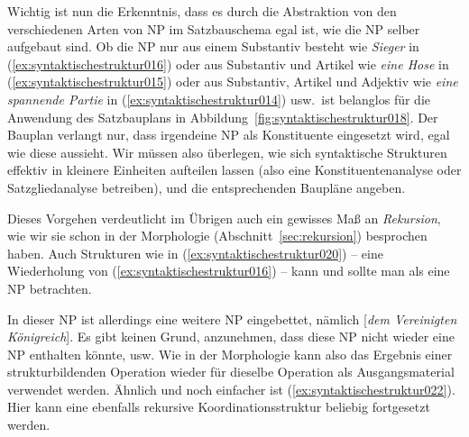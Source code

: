 Wichtig ist nun die Erkenntnis, dass es durch die Abstraktion von den verschiedenen Arten von NP im Satzbauschema egal ist, wie die NP selber aufgebaut sind.
Ob die NP nur aus einem Substantiv besteht wie \textit{Sieger} in (\ref{ex:syntaktischestruktur016}) oder aus Substantiv und Artikel wie \textit{eine Hose} in (\ref{ex:syntaktischestruktur015}) oder aus Substantiv, Artikel und Adjektiv wie \textit{eine spannende Partie} in (\ref{ex:syntaktischestruktur014}) usw.\ ist belanglos für die Anwendung des Satzbauplans in Abbildung~\ref{fig:syntaktischestruktur018}.
Der Bauplan verlangt nur, dass irgendeine NP als Konstituente eingesetzt wird, egal wie diese aussieht.
Wir müssen also überlegen, wie sich syntaktische Strukturen effektiv in kleinere Einheiten aufteilen lassen (also eine Konstituentenanalyse oder Satzgliedanalyse betreiben), und die entsprechenden Baupläne angeben.


Dieses Vorgehen verdeutlicht im Übrigen auch ein gewisses Maß an \textit{Rekursion}, wie wir sie schon in der Morphologie (Abschnitt~\ref{sec:rekursion}) besprochen haben.
Auch Strukturen wie in (\ref{ex:syntaktischestruktur020}) -- eine Wiederholung von (\ref{ex:syntaktischestruktur016}) -- kann und sollte man als eine NP betrachten.

\begin{exe}
\end{exe}

In dieser NP ist allerdings eine weitere NP eingebettet, nämlich [\textit{dem Vereinigten Königreich}].
Es gibt keinen Grund, anzunehmen, dass diese NP nicht wieder eine NP enthalten könnte, usw.
Wie in der Morphologie kann also das Ergebnis einer strukturbildenden Operation wieder für dieselbe Operation als Ausgangsmaterial verwendet werden.
Ähnlich und noch einfacher ist (\ref{ex:syntaktischestruktur022}).
Hier kann eine ebenfalls rekursive Koordinationsstruktur beliebig fortgesetzt werden.\label{abs:syntaktischestruktur021}

\begin{exe}
\end{exe}


